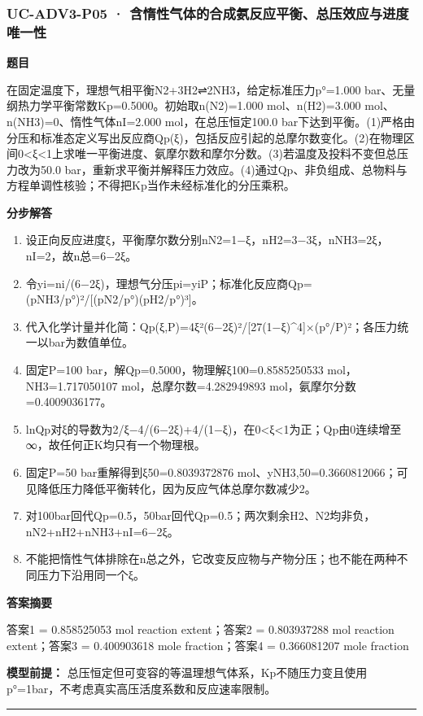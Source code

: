 \documentclass[UTF8,11pt,a4paper]{ctexart}
\begin{document}
\subsubsection*{UC-ADV3-P05 · 含惰性气体的合成氨反应平衡、总压效应与进度唯一性}
\noindent\textbf{题目}\par
在固定温度下，理想气相平衡N2+3H2⇌2NH3，给定标准压力p°=1.000 bar、无量纲热力学平衡常数Kp=0.5000。初始取n(N2)=1.000 mol、n(H2)=3.000 mol、n(NH3)=0、惰性气体nI=2.000 mol，在总压恒定100.0 bar下达到平衡。(1)严格由分压和标准态定义写出反应商Qp(ξ)，包括反应引起的总摩尔数变化。(2)在物理区间0<ξ<1上求唯一平衡进度、氨摩尔数和摩尔分数。(3)若温度及投料不变但总压力改为50.0 bar，重新求平衡并解释压力效应。(4)通过Qp、非负组成、总物料与方程单调性核验；不得把Kp当作未经标准化的分压乘积。\par
\medskip\noindent\textbf{分步解答}
\begin{enumerate}
\item 设正向反应进度ξ，平衡摩尔数分别nN2=1−ξ，nH2=3−3ξ，nNH3=2ξ，nI=2，故n总=6−2ξ。
\item 令yi=ni/(6−2ξ)，理想气分压pi=yiP；标准化反应商Qp=(pNH3/p°)²/[(pN2/p°)(pH2/p°)³]。
\item 代入化学计量并化简：Qp(ξ,P)=4ξ²(6−2ξ)²/[27(1−ξ)\textasciicircum{}4]×(p°/P)²；各压力统一以bar为数值单位。
\item 固定P=100 bar，解Qp=0.5000，物理解ξ100=0.8585250533 mol，NH3=1.717050107 mol，总摩尔数=4.282949893 mol，氨摩尔分数=0.4009036177。
\item lnQp对ξ的导数为2/ξ−4/(6−2ξ)+4/(1−ξ)，在0<ξ<1为正；Qp由0连续增至∞，故任何正K均只有一个物理根。
\item 固定P=50 bar重解得到ξ50=0.8039372876 mol、yNH3,50=0.3660812066；可见降低压力降低平衡转化，因为反应气体总摩尔数减少2。
\item 对100bar回代Qp=0.5，50bar回代Qp=0.5；两次剩余H2、N2均非负，nN2+nH2+nNH3+nI=6−2ξ。
\item 不能把惰性气体排除在n总之外，它改变反应物与产物分压；也不能在两种不同压力下沿用同一个ξ。
\end{enumerate}
\noindent\textbf{答案摘要}\par
答案1 = 0.858525053 mol reaction extent；答案2 = 0.803937288 mol reaction extent；答案3 = 0.400903618 mole fraction；答案4 = 0.366081207 mole fraction\par
\noindent\textbf{模型前提：}
总压恒定但可变容的等温理想气体系，Kp不随压力变且使用p°=1bar，不考虑真实高压活度系数和反应速率限制。\par
\medskip\hrule\medskip
{}
\end{document}
